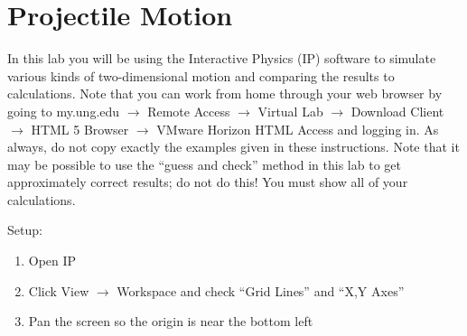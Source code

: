 \section{Projectile Motion}

In this lab you will be using the Interactive Physics (IP) software to simulate various kinds of two-dimensional motion and comparing the results to calculations.
Note that you can work from home through your web browser by going to my.ung.edu $\rightarrow$ Remote Access $\rightarrow$ Virtual Lab $\rightarrow$ Download Client $\rightarrow$ HTML 5 Browser $\rightarrow$ VMware Horizon HTML Access and logging in.
As always, do not copy exactly the examples given in these instructions.
Note that it may be possible to use the “guess and check” method in this lab to get approximately correct results; do not do this!
You must show all of your calculations.

Setup:
\begin{enumerate}
\item Open IP
\item Click View $\rightarrow$ Workspace and check ``Grid Lines'' and ``X,Y Axes''
\item Pan the screen so the origin is near the bottom left
\end{enumerate}

